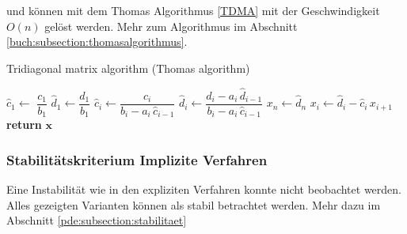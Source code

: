	   und k\"onnen mit dem Thomas Algorithmus \autoref{TDMA} \cite{burgers:thomas} mit der Geschwindigkeit $O(n)$ gel\"ost werden.
	   Mehr zum Algorithmus im Abschnitt \ref{buch:subsection:thomasalgorithmus}.

	\begin{algorithm}\caption{Tridiagonal matrix algorithm (Thomas algorithm)}\label{TDMA}
	  \setlength{\lineskip}{7pt}
	  \begin{algorithmic}[1]
	      \State $\hat c_1 \gets$ $ \dfrac{c_1}{b_1}$
	      \State $\hat d_1 \gets \dfrac{d_1}{b_1}$
	        \State $\hat c_i \gets \dfrac{c_i}{b_i-a_i \, \hat c_{i-1}}$
	      \EndFor
	        \State $\hat d_i \gets \dfrac{d_i - a_i \, \hat d_{i-1}}{b_i-a_i \, \hat c_{i-1}}$
	      \EndFor
	      \State $x_n \gets \hat d_n$
	        \State $x_i \gets \hat d_i - \hat c_i \, x_{i+1}$
	      \EndFor
	      \State \textbf{return} $\textbf{x}$
	    \EndFunction
	  \end{algorithmic}
	\end{algorithm}

	\subsubsection{Stabilit\"atskriterium Implizite Verfahren}

	Eine Instabilit\"at wie in den expliziten Verfahren konnte nicht beobachtet werden.
	Alles gezeigten Varianten k\"onnen als stabil betrachtet werden.
	Mehr dazu im Abschnitt \ref{pde:subsection:stabilitaet}
